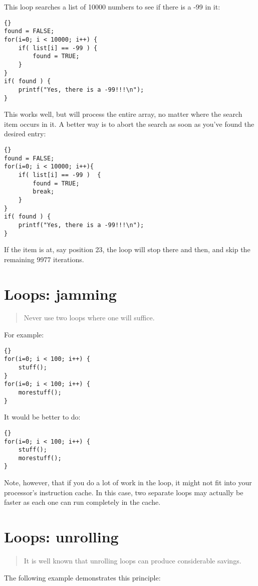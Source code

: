 \documentclass{report}
\begin{document}
This loop searches a list of 10000 numbers to see if there is a -99 in it: 
\begin{lstlisting}{}
found = FALSE; 
for(i=0; i < 10000; i++) { 
    if( list[i] == -99 ) { 
        found = TRUE; 
    } 
} 
if( found ) {
    printf("Yes, there is a -99!!!\n");
}
\end{lstlisting}
This works well, but will process the entire array, no matter where the search item occurs in it. A better way is to abort the search as soon as you've found the desired entry: 
\begin{lstlisting}{}
found = FALSE; 
for(i=0; i < 10000; i++){ 
    if( list[i] == -99 )  { 
        found = TRUE; 
        break; 
    } 
} 
if( found ) {
    printf("Yes, there is a -99!!!\n");
}
\end{lstlisting}
If the item is at, say position 23, the loop will stop there and then, and skip the remaining 9977 iterations. 


\section{Loops: jamming}
\begin{quote}
Never use two loops where one will suffice.
\end{quote}
For example:
\begin{lstlisting}{}
for(i=0; i < 100; i++) {
    stuff();
}
for(i=0; i < 100; i++) {
    morestuff();
}
\end{lstlisting}
It would be better to do: 
\begin{lstlisting}{}
for(i=0; i < 100; i++) {
    stuff();
    morestuff();
}
\end{lstlisting}
Note, however, that if you do a lot of work in the loop, it might not fit into your processor's instruction cache. In this case, two separate loops may actually be faster as each one can run completely in the cache. 

\section{Loops: unrolling}
\begin{quote}
It is well known that unrolling loops can produce considerable savings.
\end{quote}
The following example demonstrates this principle:
\newline
\end{document}
